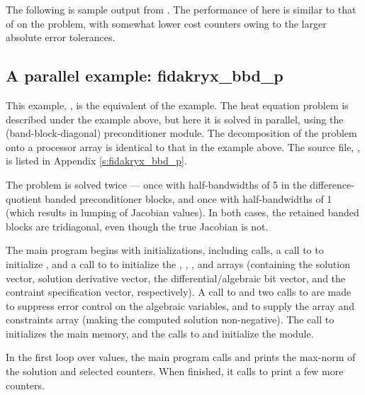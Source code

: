 The following is sample output from .
The performance of {\fida} here is similar to that of {\ida} on
the  problem, with somewhat lower cost counters owing to
the larger absolute error tolerances.



\subsection{A parallel example: fidakryx\_bbd\_p}\label{ss:fidakryx_bbd_p}

This example, , is the {\F} equivalent of the 
example.  The heat equation problem is described under the 
example above, but here it is solved in parallel, using the {\idabbdpre}
(band-block-diagonal) preconditioner module.  The decomposition of the
problem onto a processor array is identical to that in the 
example above.  The source file, , is listed in
Appendix \ref{s:fidakryx_bbd_p}.

The problem is solved twice --- once with half-bandwidths of 5 in the
difference-quotient banded preconditioner blocks, and once with
half-bandwidths of 1 (which results in lumping of Jacobian values).
In both cases, the retained banded blocks are tridiagonal, even though
the true Jacobian is not.

The main program begins with initializations, including {\mpi} calls,
a call to  to initialize {\nvecp}, and a call to
 to initialize the , , , and
 arrays (containing the solution vector, solution derivative vector,
the differential/algebraic bit vector, and the contraint specification
vector, respectively).  A call to  and two calls to
 are made to suppress error control on the algebraic
variables, and to supply the  array and constraints array (making
the computed solution non-negative).  The call to 
initializes the {\fida} main memory, and the calls to 
and  initialize the {\fidabbd} module.

In the first loop over  values, the main program calls 
and prints the max-norm of the solution and selected counters.  When finished,
it calls  to print a few more counters.

